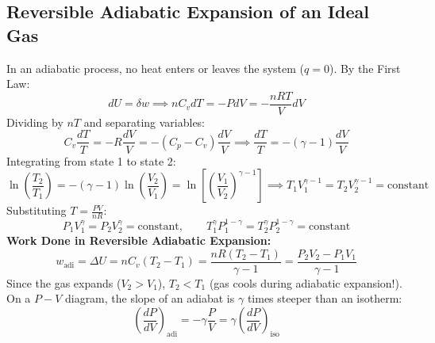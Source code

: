 \documentclass[10pt,a4paper]{article}
\begin{document}
\subsection{Reversible Adiabatic Expansion of an Ideal Gas}
In an adiabatic process, no heat enters or leaves the system ($q = 0$). By the First Law:
\begin{equation}
  dU = \delta w \implies n C_v dT = -P dV = -\frac{n R T}{V} dV
\end{equation}
Dividing by $n T$ and separating variables:
\begin{equation}
  C_v \frac{dT}{T} = -R \frac{dV}{V} = -(C_p - C_v)\frac{dV}{V} \implies \frac{dT}{T} = -(\gamma - 1)\frac{dV}{V}
\end{equation}
Integrating from state 1 to state 2:
\begin{equation}
  \ln\left(\frac{T_2}{T_1}\right) = -(\gamma - 1)\ln\left(\frac{V_2}{V_1}\right) = \ln\left[\left(\frac{V_1}{V_2}\right)^{\gamma - 1}\right] \implies T_1 V_1^{\gamma - 1} = T_2 V_2^{\gamma - 1} = \text{constant}
\end{equation}
Substituting $T = \frac{P V}{n R}$:
\begin{equation}
  P_1 V_1^\gamma = P_2 V_2^\gamma = \text{constant}, \qquad T_1^\gamma P_1^{1-\gamma} = T_2^\gamma P_2^{1-\gamma} = \text{constant}
\end{equation}
\textbf{Work Done in Reversible Adiabatic Expansion:}
\begin{equation}
  w_{\text{adi}} = \Delta U = n C_v(T_2 - T_1) = \frac{n R(T_2 - T_1)}{\gamma - 1} = \frac{P_2 V_2 - P_1 V_1}{\gamma - 1}
\end{equation}
Since the gas expands ($V_2 > V_1$), $T_2 < T_1$ (gas cools during adiabatic expansion!). On a $P-V$ diagram, the slope of an adiabat is $\gamma$ times steeper than an isotherm:
\begin{equation}
  \left(\frac{dP}{dV}\right)_{\text{adi}} = -\gamma \frac{P}{V} = \gamma \left(\frac{dP}{dV}\right)_{\text{iso}}
\end{equation}
\end{document}
